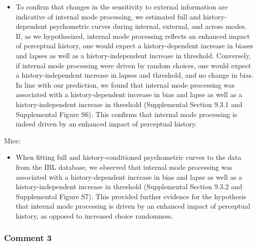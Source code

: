 \documentclass[
]{article}
\providecommand{\tightlist}{%
  \setlength{\itemsep}{0pt}\setlength{\parskip}{0pt}}
\begin{document}
\begin{itemize}
\tightlist
\item
  To confirm that changes in the sensitivity to external information are
  indicative of internal mode processing, we estimated full and
  history-dependent psychometric curves during internal, external, and
  across modes. If, as we hypothesized, internal mode processing
  reflects an enhanced impact of perceptual history, one would expect a
  history-dependent increase in biases and lapses as well as a
  history-independent increase in threshold. Conversely, if internal
  mode processing were driven by random choices, one would expect a
  history-independent increase in lapses and threshold, and no change in
  bias. In line with our prediction, we found that internal mode
  processing was associated with a history-dependent increase in bias
  and lapse as well as a history-independent increase in threshold
  (Supplemental Section 9.3.1 and Supplemental Figure S6). This confirms
  that internal mode processing is indeed driven by an enhanced impact
  of perceptual history.
\end{itemize}

Mice:

\begin{itemize}
\tightlist
\item
  When fitting full and history-conditioned psychometric curves to the
  data from the IBL database, we observed that internal mode processing
  was associated with a history-dependent increase in bias and lapse as
  well as a history-independent increase in threshold (Supplemental
  Section 9.3.2 and Supplemental Figure S7). This provided further
  evidence for the hypothesis that internal mode processing is driven by
  an enhanced impact of perceptual history, as opposed to increased
  choice randomness.
\end{itemize}

\hypertarget{comment-3-1}{%
\subsubsection{Comment 3}\label{comment-3-1}}
\end{document}
